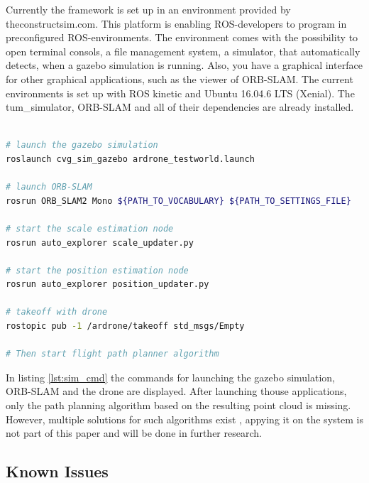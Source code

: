 	Currently the framework is set up in an environment provided by theconstructsim.com. This platform is enabling ROS-developers to program in preconfigured
	ROS-environments. The environment comes with the possibility to open terminal consols, a file management system, a simulator, that automatically 
	detects, when a gazebo simulation is running. Also, you have a graphical interface for other graphical applications, such as the viewer of ORB-SLAM.
	The current environments is set up with ROS kinetic and Ubuntu 16.04.6 LTS (Xenial). The tum\_simulator, ORB-SLAM and all of their dependencies are already installed. 
	
	\begin{lstlisting}[language=bash, caption=Launching the simulated environment, label=lst:sim_cmd]
	
# launch the gazebo simulation
roslaunch cvg_sim_gazebo ardrone_testworld.launch
	
# launch ORB-SLAM
rosrun ORB_SLAM2 Mono ${PATH_TO_VOCABULARY} ${PATH_TO_SETTINGS_FILE}

# start the scale estimation node
rosrun auto_explorer scale_updater.py

# start the position estimation node
rosrun auto_explorer position_updater.py
	
# takeoff with drone 
rostopic pub -1 /ardrone/takeoff std_msgs/Empty

# Then start flight path planner algorithm

	\end{lstlisting}
	
	In listing \ref{lst:sim_cmd} the commands for launching the gazebo simulation, ORB-SLAM and the drone are displayed. After launching thouse 
	applications, only the path planning algorithm based on the resulting point cloud is missing. However, multiple solutions for such algorithms 
	exist \cite{path}, appying it on the system is not part of this paper and will be done in further research. 

	\subsection{Known Issues}
